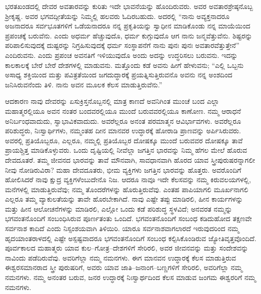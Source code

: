 ಭರತಖಂಡದಲ್ಲಿ ದೇವರ ಅವತಾರವನ್ನು ಕುರಿತು ಇದೇ ಭಾವನೆಯನ್ನು ಹೊಂದಿರುವರು. ಅವರ ಅವತಾರಶ್ರೇಷ್ಠನೊಬ್ಬ ಶ‍್ರೀಕೃಷ್ಣ. ಅವರ ಭಗವದ್ಗೀತೆಯನ್ನು ನಿಮ್ಮಲ್ಲಿ ಹಲವರು ಓದಿರಬಹುದು. ಅದರಲ್ಲಿ “ನಾನು ಅವ್ಯಕ್ತನಾದರೂ ಅಜನಾದರೂ ಸರ್ವಭೂತಗಳಿಗೆ ಒಡೆಯನಾದರೂ ನನ್ನ ಪ್ರಕೃತಿಯನ್ನು ಸ್ವಾಧೀನ ಮಾಡಿಕೊಂಡು ನನ್ನ ಮಾಯೆಯಿಂದ ಪ್ರಪಂಚಕ್ಕೆ ಬರುವೆನು. ಎಂದು ಅಧರ್ಮ ಹೆಚ್ಚುವುದೊ, ಧರ್ಮ ಕುಗ್ಗುವುದೊ ಆಗ ನಾನು ಜನ್ಮವೆತ್ತುವೆನು. ಶಿಷ್ಟರನ್ನು ಪರಿಪಾಲಿಸುವುದಕ್ಕೆ ದುಷ್ಟರನ್ನು ನಿಗ್ರಹಿಸುವುದಕ್ಕೆ ಧರ್ಮ ಸಂಸ್ಥಾಪನೆಗೆ ನಾನು ಪುನಃ ಪುನಃ ಅವತಾರವೆತ್ತುತ್ತೇನೆ” ಎಂದಿರುವನು. ಎಂದು ಪ್ರಪಂಚ ಅವನತಿಗೆ ಇಳಿಯುವುದೊ ಅಂದು ಅದನ್ನು ಉದ್ಧರಿಸಲು ಬರುವನು. ಇದನ್ನು ಕಾಲಕಾಲಕ್ಕೆ ಬೇರೆ ಬೇರೆ ದೇಶಗಳಲ್ಲಿ ಮಾಡುವನು. ಮತ್ತೊಂದು ಕಡೆ ಅವನು ಹೀಗೆ ಹೇಳುವನು; “ಎಲ್ಲಿ ಒಬ್ಬನು ಅಸಾಧ್ಯ ಶಕ್ತಿಯಿಂದ ಮತ್ತು ಪವಿತ್ರತೆಯಿಂದ ಜಗದುದ್ಧಾರಕ್ಕೆ ಪ್ರಯತ್ನಿಸುತ್ತಿರುವನೊ ಅವನು ನನ್ನ ಅಂಶದಿಂದ ಜನಿಸಿರುವನೆಂದು ತಿಳಿ. ನಾನು ಅವನ ಮೂಲಕ ಕೆಲಸ ಮಾಡುತ್ತಿರುವೆನು.”

ಆದಕಾರಣ ನಾವು ದೇವರನ್ನು ಏಸುಕ್ರಿಸ್ತನೊಬ್ಬನಲ್ಲಿ ಮಾತ್ರ ಕಾಣದೆ ಅವನಿಗಿಂತ ಮುಂಚೆ ಬಂದ ಎಲ್ಲಾ ಮಹಾತ್ಮರಲ್ಲಿಯೂ ಅವನ ನಂತರ ಬಂದವರಲ್ಲಿಯೂ ಮುಂದೆ ಬರುವವರಲ್ಲಿಯೂ ಕಾಣೋಣ. ನಮ್ಮ ಆರಾಧನೆ ಅನಿರ್ಬಂಧವಾದುದು, ಸ್ವಾಭಾವಿಕವಾ\-ದುದು. ಅವರೆಲ್ಲರೂ ಅನಂತ ಪರಮಾತ್ಮನ ಆವಿರ್ಭಾವಗಳು. ಅವರೆಲ್ಲರೂ ಪರಿಶುದ್ಧರು, ನಿಃಸ್ವಾರ್ಥಿಗಳು, ನಮ್ಮಂತಹ ದೀನ ಮಾನವರ ಉದ್ಧಾರಕ್ಕೆ ಹೋರಾಡಿ ಪ್ರಾಣವನ್ನು ಅರ್ಪಿಸಿ\break ರುವರು. ಅವರಲ್ಲಿ ಪ್ರತಿಯೊಬ್ಬರೂ, ಎಲ್ಲರೂ, ನಮ್ಮಲ್ಲಿ ಪ್ರತಿಯೊಬ್ಬರ ದೋಷಕ್ಕೂ ಮುಂದೆ ಬರುವವರ ದೋಷಕ್ಕೂ ತಾವೆ ಪ್ರಾಯಶ್ಚಿತ್ತ ಮಾಡಿಕೊಳ್ಳುವರು. ಒಂದು ದೃಷ್ಟಿಯಲ್ಲಿ ನೀವೆಲ್ಲಾ ಜಗತ್ತಿನ ಭಾರವನ್ನು ನಿಮ್ಮ ಹೆಗಲ ಮೇಲೆ ಹೊರುವ ದೇವದೂತರೆ. ತಮ್ಮ ಜೀವನದ ಭಾರವನ್ನು ತಾವೆ ಮೌನವಾಗಿ, ಸಾವಧಾನವಾಗಿ ಹೊರದ ಯಾವ ಸ್ತ್ರೀ\-ಪುರುಷರನ್ನಾಗಲೀ ನೀವು ನೋಡಿರುವಿರಾ? ಮಹಾ ದೇವದೂತರು, ಭೀಮ ವ್ಯಕ್ತಿಗಳು ಜಗ\break ತ್ತಿನ ಭಾರವನ್ನು ಹೊತ್ತರು. ಅವರೊಂದಿಗೆ ಹೋಲಿಸಿದರೆ ನಾವು ಕ್ಷುದ್ರ ವ್ಯಕ್ತಿಗಳೆಂಬುದೇನೊ ನಿಜ. ಆದರೂ ನಾವೂ ಇದೇ ಕೆಲಸವನ್ನು ನಮ್ಮ ಕಿರುವಲಯಗಳಲ್ಲಿ, ಮನೆಗಳಲ್ಲಿ ಮಾಡುತ್ತಿ\break ರುವೆವು; ನಮ್ಮ ತೊಂದರೆಗಳನ್ನು ಹೊರುತ್ತಿರುವೆವು. ಎಂತಹ ಪಾಪಿಯಾಗಲಿ ಮೂರ್ಖನಾ\break ಗಲಿ ಎಲ್ಲರೂ ತಮ್ಮ ವ್ಯಾಕುಲತೆಯನ್ನು ತಾವೇ ಹೊರಬೇಕಾಗಿದೆ. ನಾವು ಎಷ್ಟೇ ತಪ್ಪು ಮಾಡಿರಲಿ, ಹೀನ ಕಾರ್ಯಗಳನ್ನು ಮತ್ತು ಹೀನ ಆಲೋಚನೆಗಳನ್ನು ಮಾಡಿರಲಿ, ಎಲ್ಲೋ ಒಂದು ಕಡೆ ಪರಿಶುದ್ಧ ಸ್ಥಳವಿದೆ; ಅನವರತ ನಮ್ಮನ್ನು ಭಗವಂತ\-ನೊಂದಿಗೆ ಸಂಬಂಧಿಸಿರುವ ಪೂರ್ಣತಂತು ಒಂದಿದೆ. ಭಗವಂತನೊಂದಿಗೆ ಸಂಬಂಧ ಕಡಿದುಹೋದ ತಕ್ಷಣವೇ ಸರ್ವನಾಶ ಕಾದಿದೆ ಎಂದು ನಿಸ್ಸಂಶಯವಾಗಿ ತಿಳಿಯಿರಿ. ಯಾರೂ ಸರ್ವನಾಶವಾಗಲಾರದೆ ಇರುವುದರಿಂದ ನಮ್ಮ ಹೃದಯಾಂತರಾಳದಲ್ಲಿ ಎಷ್ಟೇ ಅಸ್ಪಷ್ಟವಾದರೂ ಭಗವಂತನೊಂದಿಗೆ ಸಂಬಂಧ ಕಲ್ಪಿಸಿಕೊಂಡಿರುವ ಜ್ಯೋತಿವೃತ್ತವೊಂದಿದೆ. ಪೂರ್ವಕಾಲದ ಮಹಾತ್ಮರು ಯಾವ ಕುಲ–ಗೋತ್ರ–ದೇಶಗಳಿಗೆ ಸೇರಿರಲಿ, ಅವರ ಜೀವನವನ್ನು ಮತ್ತು ಸಂದೇಶವನ್ನು ನಾವಿಂದು ಪಡೆದಿರುವೆವು. ಅವರಿಗೆಲ್ಲಾ ನಮ್ಮ ನಮನಗಳು. ಈಗ ಮಾನವನ ಉದ್ಧಾರಕ್ಕೆ ಕೆಲಸ ಮಾಡುತ್ತಿರುವ ಈಶ್ವರಸಮಾನರಾದ ಸ್ತ್ರೀ ಪುರುಷರಿಗೆ, ಅವರು ಯಾವ ಜಾತಿ–ಜನಾಂಗ–ಬಣ್ಣಗಳಿಗೆ ಸೇರಿರಲಿ, ಅವರಿಗೆಲ್ಲಾ ನಮ್ಮ ನಮನಗಳು. ನಮ್ಮ ಅನಂತರ ಬರುವ, ಜನರ ಉದ್ಧಾರಕ್ಕೆ ನಿಃಸ್ವಾರ್ಥದಿಂದ ಕೆಲಸ ಮಾಡುವ ಜಂಗಮ ಈಶ್ವರರಿಗೆ ನಮ್ಮ ನಮನಗಳು.

